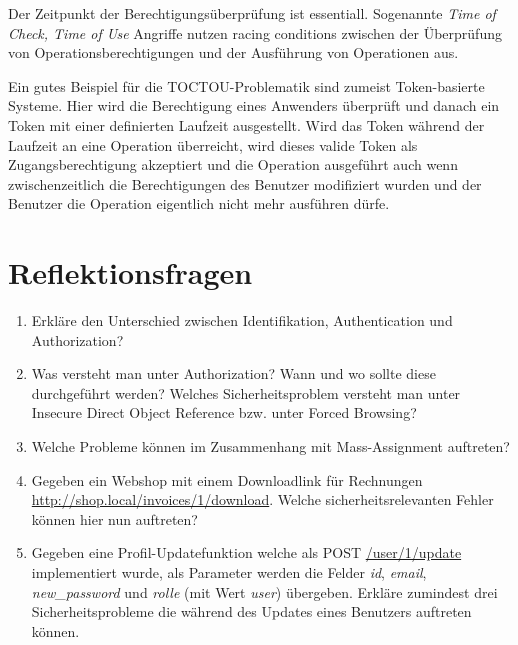 Der Zeitpunkt der Berechtigungsüberprüfung ist essentiall. Sogenannte \textit{Time of Check, Time of Use} Angriffe nutzen racing conditions zwischen der Überprüfung von Operationsberechtigungen und der Ausführung von Operationen aus.

Ein gutes Beispiel für die TOCTOU-Problematik sind zumeist Token-basierte Systeme. Hier wird die Berechtigung eines Anwenders überprüft und danach ein Token mit einer definierten Laufzeit ausgestellt. Wird das Token während der Laufzeit an eine Operation überreicht, wird dieses valide Token als Zugangsberechtigung akzeptiert und die Operation ausgeführt auch wenn zwischenzeitlich die Berechtigungen des Benutzer modifiziert wurden und der Benutzer die Operation eigentlich nicht mehr ausführen dürfe.

\section{Reflektionsfragen}

\begin{enumerate}
	\item Erkläre den Unterschied zwischen Identifikation, Authentication und Authorization?
	\item Was versteht man unter Authorization? Wann und wo sollte diese durchgeführt werden? Welches Sicherheitsproblem versteht man unter Insecure Direct Object Reference bzw. unter Forced Browsing?
	\item Welche Probleme können im Zusammenhang mit Mass-Assignment auftreten?
	\item Gegeben ein Webshop mit einem Downloadlink für Rechnungen \url{http://shop.local/invoices/1/download}. Welche sicherheitsrelevanten Fehler können hier nun auftreten?
	\item Gegeben eine Profil-Updatefunktion welche als POST \url{/user/1/update} implementiert wurde, als Parameter werden die Felder \textit{id}, \textit{email}, \textit{new\_password} und \textit{rolle} (mit Wert \textit{user}) übergeben. Erkläre zumindest drei Sicherheitsprobleme die während des Updates eines Benutzers auftreten können.
\end{enumerate}

